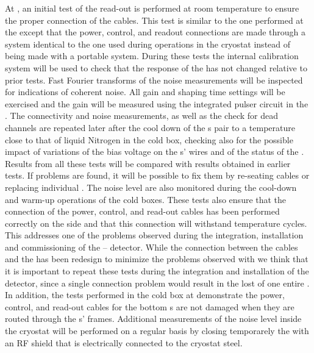 At \surf, an initial test of the read-out is performed at room temperature to
ensure the proper connection of the cables. This test is similar to the one
performed at the  except that the power, control, and readout
connections are made through a system identical to the one used during
operations in the cryostat instead of being made with a portable system.
During these tests the internal calibration system will be used to check
that the response of the  has not changed relative to prior
tests. Fast Fourier transforms of the noise measurements will be inspected
for indications of coherent noise. All  gain and shaping time
settings will be exercised and the gain will be measured using the
integrated pulser circuit in the  . 
The connectivity and noise measurements, as well as the check for dead
channels are repeated later after the cool down of the s pair
to a temperature close to that of liquid Nitrogen in the cold box, 
checking also for the possible impact of variations of the bias voltage
on the s' wires and of the status of the .
Results from all these tests will be compared with results obtained 
in earlier  tests.  If problems are found, it will be possible 
to fix them by re-seating cables or replacing individual .
The noise level are also monitored during the cool-down and warm-up 
operations of the cold boxes. These tests also ensure that the connection
of the power, control, and read-out cables has been performed correctly
on the  side and that this connection will withstand temperature 
cycles. This addresses one of the problems observed during the integration,
installation and commissioning of the -- 
detector. While the connection between the cables and the 
has been redesign to minimize the problems observed with 
we think that it is important to repeat these tests during the integration
and installation of the detector, since a single connection problem would
result in the lost of one entire . In addition, the tests 
performed in the cold box at \surf demonstrate the power, control, and read-out
cables for the bottom s are not damaged when they are routed 
through the s' frames. Additional measurements of the noise
level inside the cryostat will be performed on a regular basis by closing 
temporarely the  with an RF shield that is electrically connected 
to the cryostat steel. 


